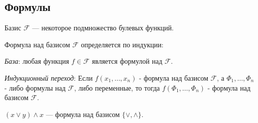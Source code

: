 \subsection{Формулы}

\begin{defn}
    Базис $\mathcal{F}$ --- некоторое подмножество булевых функций.
\end{defn}

\begin{defn}
    Формула над базисом $\mathcal{F}$ определяется по индукции:
    
    \textsl{База}: любая функция $f \in \mathcal{F}$ является формулой над $\mathcal{F}$. 
    
    \textsl{Индукционный переход}: Если  $f(x_1, \ldots ,x_n)$ - формула над базисом $\mathcal{F}$, а $\Phi_1, \ldots ,\Phi_n$ - либо формулы над $\mathcal{F}$, либо переменные, то тогда $f(\Phi_1, \ldots ,\Phi_n)$ - формула над базисом $\mathcal{F}$.
    
    \begin{example}
         $(x \vee y) \wedge x$ --- формула над базисом $\{ \vee, \wedge \}$.
    \end{example}
\end{defn}